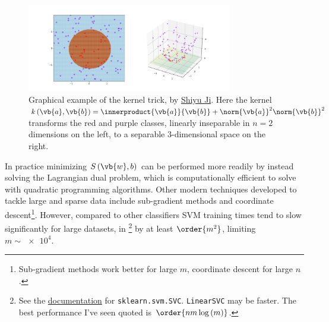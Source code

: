 \begin{figure}[H]
\centering
\includegraphics[width=0.8\textwidth,trim={4.0cm 0.8cm 4.0cm 1.4cm},clip]{figures/ml/kernel_trick_example.png}%
\caption{
Graphical example of the kernel trick, by \href{https://en.wikipedia.org/wiki/File:Kernel_trick_idea.svg}{Shiyu Ji}.
Here the kernel $k\left(\vb{a},\vb{b}\right) = \innerproduct{\vb{a}}{\vb{b}} + \norm{\vb{a}}^{2} \norm{\vb{b}}^{2}$
transforms the red and purple classes, linearly inseparable in $n=2$ dimensions on the left,
to a separable $3$-dimensional space on the right.
}
\label{fig:svm_kernel_trick}
\end{figure}

In practice minimizing $S\left(\vb{w}, b\right)$ can be
performed more readily by instead solving the Lagrangian dual problem,
which is computationally efficient to solve with quadratic programming algorithms.
Other modern techniques developed to tackle large and sparse data include
sub-gradient methods and coordinate descent\footnote{Sub-gradient methods work better for large $m$,
coordinate descent for large $n$.}.
However, compared to other classifiers SVM training times
tend to slow significantly for large datasets,
in \sklearn\footnote{See the
\href{https://scikit-learn.org/stable/modules/generated/sklearn.svm.SVC.html}{documentation}
for \texttt{sklearn.svm.SVC}.
\texttt{LinearSVC} may be faster.
The best performance I've seen quoted is $\order{n m \log{\left(m\right)}}$.} by
at least $\order{m^{2}}$, limiting $m \sim \num{e4}$.


